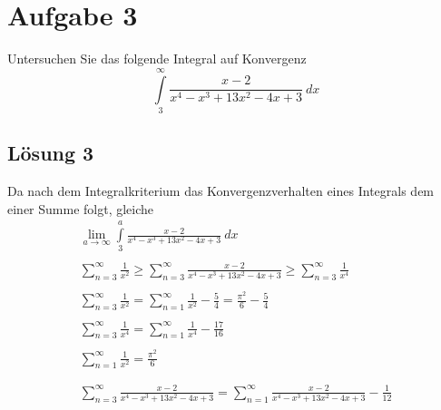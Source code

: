 \documentclass[main.tex]{subfiles}
\begin{document}
\section{Aufgabe 3}
Untersuchen Sie das folgende Integral auf Konvergenz
\begin{equation*}
    \int\limits _{3}^{\infty }\frac{x-2}{x^{4} -x^{3} +13x^{2} -4x+3} \ dx
\end{equation*}

\subsection{Lösung 3}
Da nach dem Integralkriterium das Konvergenzverhalten eines Integrals dem einer Summe folgt, gleiche 
\begin{gather*}
    \lim _{a\rightarrow \infty }\int\limits _{3}^{a}\frac{x-2}{x^{4} -x^{3} +13x^{2} -4x+3} \ dx\\
    \\
    \sum _{n=3}^{\infty }\frac{1}{x^{2}} \geq \sum _{n=3}^{\infty }\frac{x-2}{x^{4} -x^{3} +13x^{2} -4x+3} \geq \sum _{n=3}^{\infty }\frac{1}{x^{4}}\\
    \\
    \sum _{n=3}^{\infty }\frac{1}{x^{2}} =\sum _{n=1}^{\infty }\frac{1}{x^{2}} -\frac{5}{4} =\frac{\pi ^{2}}{6} -\frac{5}{4}\\
    \\
    \sum _{n=3}^{\infty }\frac{1}{x^{4}} =\sum _{n=1}^{\infty }\frac{1}{x^{4}} -\frac{17}{16}\\
    \\
    \sum _{n=1}^{\infty }\frac{1}{x^{2}} =\frac{\pi ^{2}}{6}\\
    \\
    \\
    \sum _{n=3}^{\infty }\frac{x-2}{x^{4} -x^{3} +13x^{2} -4x+3} =\sum _{n=1}^{\infty }\frac{x-2}{x^{4} -x^{3} +13x^{2} -4x+3} -\frac{1}{12}
\end{gather*}
\end{document}
